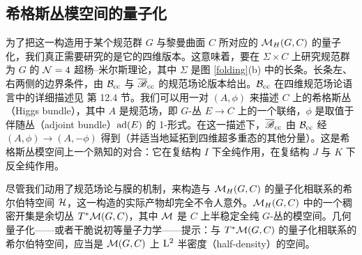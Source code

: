 
 \subsection{希格斯丛模空间的量子化}\label{aphiggs}
 
 为了把这一构造用于某个规范群 $G$ 与黎曼曲面 $C$ 所对应的 ${\mathcal M}_H(G,C)$ 的量子化，我们真正需要研究的是它的四维版本。这意味着，要在 $\Sigma\times C$ 上研究规范群为 $G$ 的 ${\mathcal N}=4$ 超杨–米尔斯理论，其中 $\Sigma$ 是图 \ref{folding}(b) 中的长条。长条左、右两侧的边界条件，由 ${\mathcal B}_{\mathrm{cc}}$ 与 ${\overline {\mathscr B}}_{\mathrm{cc}}$ 的规范场论版本给出。${\mathcal B}_{\mathrm{cc}}$ 在四维规范场论语言中的详细描述见 \cite{KW} 第 12.4 节。我们可以用一对 $(A,\phi)$ 来描述 $C$ 上的希格斯丛（Higgs bundle），其中 $A$ 是规范场，即 $G$-丛 $E\to C$ 上的一个联络，$\phi$ 是取值于伴随丛（adjoint bundle）${\mathrm{ad}}(E)$ 的 1-形式。在这一描述下，${\overline {\mathscr B}}_{\mathrm{cc}}$ 由 ${\mathcal B}_{\mathrm{cc}}$ 经 $(A,\phi)\to (A,-\phi)$ 得到（并适当地延拓到四维超多重态的其他分量）。这是希格斯丛模空间上一个熟知的对合：它在复结构 $I$ 下全纯作用，在复结构 $J$ 与 $K$ 下反全纯作用。

尽管我们动用了规范场论与膜的机制，来构造与 ${\mathcal M}_H(G,C)$ 的量子化相联系的希尔伯特空间 ${\mathcal H}$，这一构造的实际产物却完全不令人意外。${\mathcal M}_H(G,C)$ 中的一个稠密开集是余切丛 $T^*{\mathcal M}(G,C)$，其中 ${\mathcal M}$ 是 $C$ 上半稳定全纯 $G$-丛的模空间。几何量子化——或者干脆说初等量子力学——提示：与 $T^*{\mathcal M}(G,C)$ 的量子化相联系的希尔伯特空间，应当是 ${\mathcal M}(G,C)$ 上 ${\mathrm L}^2$ 半密度（half-density）的空间。

